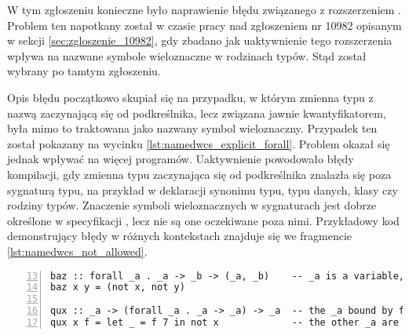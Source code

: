 \label{sec:zgloszenie_11098}

W tym zgłoszeniu konieczne było naprawienie błędu związanego z rozszerzeniem
. Problem ten napotkany został w czasie pracy nad
zgłoszeniem nr 10982 opisanym w sekcji \ref{sec:zgloszenie_10982}, gdy zbadano
jak uaktywnienie tego rozszerzenia wpływa na nazwane symbole wieloznaczne w
rodzinach typów. Stąd został wybrany po tamtym zgłoszeniu.

Opis błędu początkowo skupiał się na przypadku, w którym zmienna typu z nazwą
zaczynającą się od podkreślnika, lecz związana jawnie kwantyfikatorem, była mimo
to traktowana jako nazwany symbol wieloznaczny. Przypadek ten został pokazany na
wycinku \ref{lst:namedwcs_explicit_forall}. Problem okazał się jednak wpływać na
więcej programów. Uaktywnienie  powodowało błędy
kompilacji, gdy zmienna typu zaczynająca się od podkreślnika znalazła się poza
sygnaturą typu, na przykład w deklaracji synonimu typu, typu danych, klasy czy
rodziny typów. Znaczenie symboli wieloznacznych w sygnaturach jest dobrze
określone w specyfikacji , lecz nie są one
oczekiwane poza nimi. Przykładowy kod demonstrujący błędy w różnych kontekstach
znajduje się we fragmencie \ref{lst:namedwcs_not_allowed}.

\begin{lstlisting}[float,numbers=left,firstnumber=13,label={lst:namedwcs_explicit_forall},
                   caption={Fragment testu \code{NamedWildcardExplicitForall} sprawdzającego, czy zmienne związane kwantyfikatorem nie zostają zamienione w wieloznaczniki.}]
baz :: forall _a . _a -> _b -> (_a, _b)    -- _a is a variable, _b is a wildcard
baz x y = (not x, not y)

qux :: _a -> (forall _a . _a -> _a) -> _a  -- the _a bound by forall is a tyvar
qux x f = let _ = f 7 in not x             -- the other _a are wildcards
\end{lstlisting}

